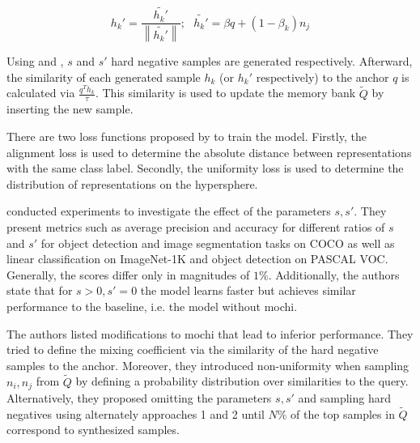 \begin{equation}
    h_k' = \frac{\tilde{h_k'}}{\left\| \tilde{h_k'}  \right\|}; \text{  } \tilde{h_k'} = \beta q + (1-\beta_k)n_j
    \label{eq:mochi_appr2}
\end{equation}

Using  and , 
$s$ and $s'$ hard negative samples are generated respectively.
Afterward, the similarity of each generated sample $h_k$ (or $h_k'$ respectively) 
to the anchor $q$ is calculated via $\frac{q^T h_k}{\tau}$.
This similarity is used to update the memory bank $\tilde{Q}$ 
by inserting the new sample.

There are two loss functions proposed by \citet{mochi_2020} to train the model.
Firstly, the alignment loss is used to determine 
the absolute distance between representations with the same class label.
Secondly, the uniformity loss is used to determine 
the distribution of representations on the hypersphere.

\citet{mochi_2020} conducted experiments to investigate the effect of the parameters $s, s'$.
They present metrics such as average precision and accuracy for different ratios of $s$ and $s'$ 
for object detection and image segmentation tasks on COCO as well as 
linear classification on ImageNet-1K and object detection on PASCAL VOC.
Generally, the scores differ only in magnitudes of $1 \%$.
Additionally, the authors state that for $s > 0, s' = 0$ the model learns faster but achieves similar performance to the baseline, i.e. the model without \ac{mochi}.


The authors listed modifications to \ac{mochi} that lead to inferior performance.
They tried to define the mixing coefficient via the similarity of the hard negative samples 
to the anchor. %
Moreover, they introduced non-uniformity when sampling $n_i, n_j$ from $\tilde{Q}$ by defining a 
probability distribution over similarities to the query. %
Alternatively, they proposed omitting the parameters $s, s'$ and 
sampling hard negatives using alternately approaches 1 and 2 until $N\%$ of the top samples in 
$\tilde{Q}$ correspond to synthesized samples.

